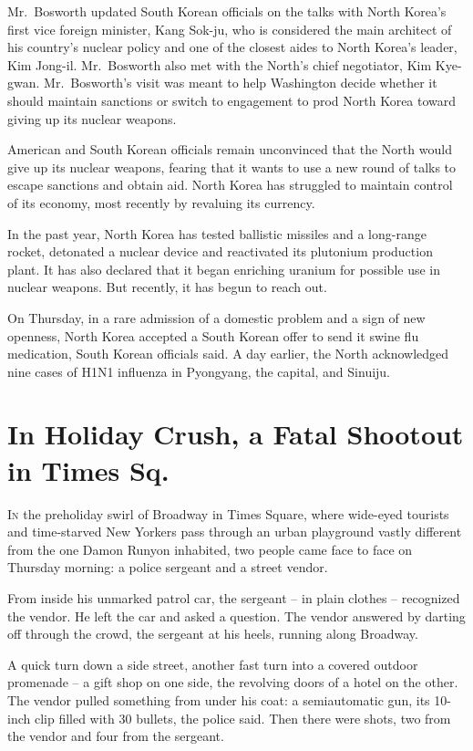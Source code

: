 ﻿\documentclass[12pt]{article}
\begin{document}
Mr.~Bosworth updated South Korean officials on the talks with North Korea's first vice foreign
minister, Kang Sok-ju, who is considered the main architect of his country's nuclear policy and one
of the closest aides to North Korea's leader, Kim Jong-il. Mr.~Bosworth also met with the North's
chief negotiator, Kim Kye-gwan. Mr.~Bosworth's visit was meant to help Washington decide whether it
should maintain sanctions or switch to engagement to prod North Korea toward giving up its nuclear
weapons.

American and South Korean officials remain unconvinced that the North would give up its nuclear
weapons, fearing that it wants to use a new round of talks to escape sanctions and obtain aid. North
Korea has struggled to maintain control of its economy, most recently by revaluing its currency.

In the past year, North Korea has tested ballistic missiles and a long-range rocket, detonated a
nuclear device and reactivated its plutonium production plant. It has also declared that it began
enriching uranium for possible use in nuclear weapons. But recently, it has begun to reach out.

On Thursday, in a rare admission of a domestic problem and a sign of new openness, North Korea
accepted a South Korean offer to send it swine flu medication, South Korean officials said. A day
earlier, the North acknowledged nine cases of H1N1 influenza in Pyongyang, the capital, and Sinuiju.

\section{In Holiday Crush, a Fatal Shootout in Times Sq.}

\lettrine{I}{n} the preholiday swirl of Broadway in Times Square, where
wide-eyed tourists and time-starved New Yorkers pass through an urban playground vastly different
from the one Damon Runyon inhabited, two people came face to face on Thursday morning: a police
sergeant and a street vendor.

From inside his unmarked patrol car, the sergeant -- in plain clothes -- recognized the vendor. He
left the car and asked a question. The vendor answered by darting off through the crowd, the
sergeant at his heels, running along Broadway.

A quick turn down a side street, another fast turn into a covered outdoor promenade -- a gift shop
on one side, the revolving doors of a hotel on the other. The vendor pulled something from under his
coat: a semiautomatic gun, its 10-inch clip filled with 30 bullets, the police said. Then there were
shots, two from the vendor and four from the sergeant.
\end{document}
